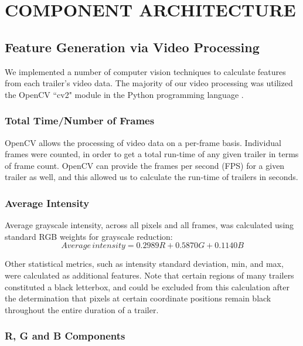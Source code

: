 \documentclass[letterpaper, 10 pt, conference]{ieeeconf}  %
\begin{document}
\section{COMPONENT ARCHITECTURE}

\subsection{Feature Generation via Video Processing}

We implemented a number of computer vision techniques to calculate features from each trailer's video data. The majority of our video processing was utilized the OpenCV ``cv2" module in the Python programming language \cite{cv2}.

\subsubsection{Total Time/Number of Frames}

OpenCV allows the processing of video data on a per-frame basis. Individual frames were counted, in order to get a total run-time of any given trailer in terms of frame count. OpenCV can provide the frames per second (FPS) for a given trailer as well, and this allowed us to calculate the run-time of trailers in seconds.

\subsubsection{Average Intensity}
Average grayscale intensity, across all pixels and all frames, was calculated using standard RGB weights for grayscale reduction:
\begin{equation*}
Average\,intensity= 0.2989R+0.5870G+0.1140B
\end{equation*}

Other statistical metrics, such as intensity standard deviation, min, and max, were calculated as additional features. Note that certain regions of many trailers constituted a black letterbox, and could be excluded from this calculation after the determination that pixels at certain coordinate positions remain black throughout the entire duration of a trailer.

\subsubsection{R, G and B Components}
\end{document}
